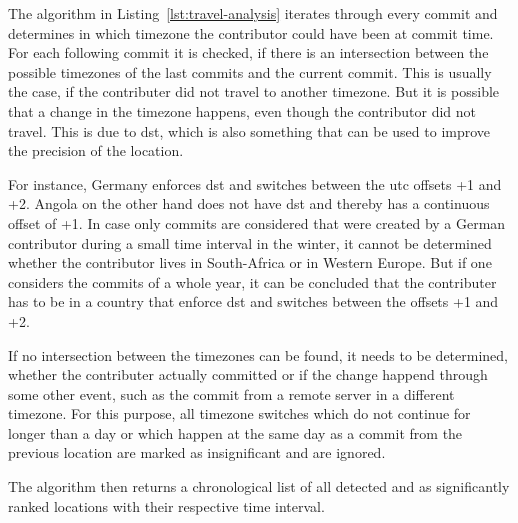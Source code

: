 The algorithm in Listing~\ref{lst:travel-analysis} iterates through every commit and determines in which timezone the contributor could have been at commit time.
For each following commit it is checked, if there is an intersection between the possible timezones of the last commits and the current commit.
This is usually the case, if the contributer did not travel to another timezone.
But it is possible that a change in the timezone happens, even though the contributor did not travel.
This is due to \ac{dst}, which is also something that can be used to improve the precision of the location.

For instance, Germany enforces \ac{dst} and switches between the \ac{utc} offsets +1 and +2. Angola on the other hand does not have \ac{dst} and thereby has a continuous offset of +1.
In case only commits are considered that were created by a German contributor during a small time interval in the winter, it cannot be determined whether the contributor lives in South-Africa or in Western Europe.
But if one considers the commits of a whole year, it can be concluded that the contributer has to be in a country that enforce \ac{dst} and switches between the offsets +1 and +2.

If no intersection between the timezones can be found, it needs to be determined, whether the contributer actually committed or if the change happend through some other event, such as the commit from a remote server in a different timezone.
For this purpose, all timezone switches which do not continue for longer than a day or which happen at the same day as a commit from the previous location are marked as insignificant and are ignored.

The algorithm then returns a chronological list of all detected and as significantly ranked locations with their respective time interval.


